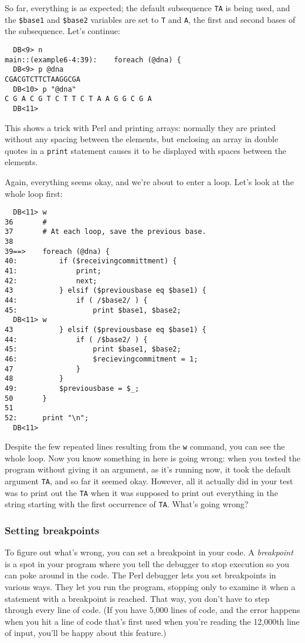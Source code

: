 So far, everything is as expected; the default subsequence \verb|TA| is being used, and the \verb|$base1| and \verb|$base2| variables are set to \verb|T| and \verb|A|, the first and second bases of the subsequence. Let's continue:

\begin{lstlisting}
  DB<9> n
main::(example6-4:39):    foreach (@dna) {
  DB<9> p @dna
CGACGTCTTCTAAGGCGA
  DB<10> p "@dna"
C G A C G T C T T C T A A G G C G A
  DB<11> 
\end{lstlisting}

This shows a trick with Perl and printing arrays: normally they are printed without any spacing between the elements, but enclosing an array in double quotes in a \verb|print| statement causes it to be displayed with spaces between the elements.

Again, everything seems okay, and we're about to enter a loop. Let's look at the whole loop first: 

\begin{lstlisting}
  DB<11> w
36       #
37       # At each loop, save the previous base.
38
39==>    foreach (@dna) {
40:          if ($receivingcommittment) {
41:              print;
42:              next;
43           } elsif ($previousbase eq $base1) {
44:              if ( /$base2/ ) {
45:                  print $base1, $base2; 
  DB<11> w
43           } elsif ($previousbase eq $base1) {
44:              if ( /$base2/ ) {
45:                  print $base1, $base2; 
46:                  $recievingcommitment = 1;
47               }
48           }
49:          $previousbase = $_;
50       }
51
52:      print "\n";
  DB<11>
\end{lstlisting}

Despite the few repeated lines resulting from the \verb|w| command, you can see the whole loop. Now you know something in here is going wrong: when you tested the program without giving it an argument, as it's running now, it took the default argument \verb|TA|, and so far it seemed okay. However, all it actually did in your test was to print out the \verb|TA| when it was supposed to print out everything in the string starting with the first occurrence of \verb|TA|. What's going wrong? 

\subsubsection{Setting breakpoints}
To figure out what's wrong, you can set a breakpoint in your code. A \textit{breakpoint} is a spot in your program where you tell the debugger to stop execution so you can poke around in the code. The Perl debugger lets you set breakpoints in various ways. They let you run the program, stopping only to examine it when a statement with a breakpoint is reached. That way, you don't have to step through every line of code. (If you have 5,000 lines of code, and the error happens when you hit a line of code that's first used when you're reading the 12,000th line of input, you'll be happy about this feature.)

